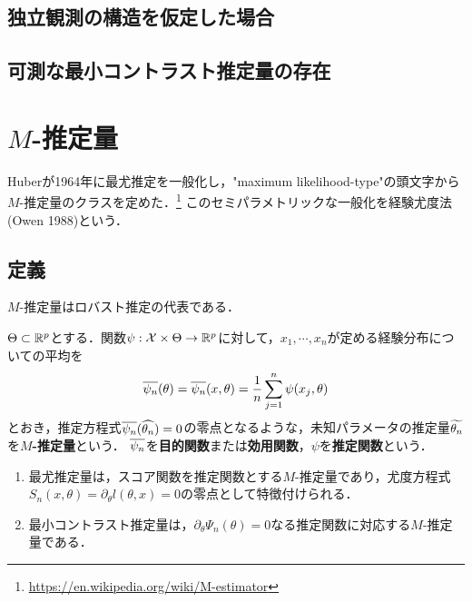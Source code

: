 \documentclass[uplatex,dvipdfmx]{jsreport}
\begin{document}
\subsection{独立観測の構造を仮定した場合}

\subsection{可測な最小コントラスト推定量の存在}

\section{$M$-推定量}

\begin{tcolorbox}[colframe=ForestGreen, colback=ForestGreen!10!white,breakable,colbacktitle=ForestGreen!40!white,coltitle=black,fonttitle=\bfseries\sffamily,
title=]
    Huberが1964年に最尤推定を一般化し，"maximum likelihood-type"の頭文字から$M$-推定量のクラスを定めた．\footnote{\url{https://en.wikipedia.org/wiki/M-estimator}}
    このセミパラメトリックな一般化を経験尤度法(Owen 1988)という．
\end{tcolorbox}

\subsection{定義}

\begin{tcolorbox}[colframe=ForestGreen, colback=ForestGreen!10!white,breakable,colbacktitle=ForestGreen!40!white,coltitle=black,fonttitle=\bfseries\sffamily,
title=]
    $M$-推定量はロバスト推定の代表である．
\end{tcolorbox}

\begin{definition}
    $\Theta\subset\mathbb{R}^p$とする．関数$\psi:\mathcal{X}\times\Theta\to\mathbb{R}^p$に対して，$x_1,\cdots,x_n$が定める経験分布についての平均を
    \[\overline{\psi_n}(\theta)=\overline{\psi_n}(x,\theta)=\frac{1}{n}\sum^n_{j=1}\psi(x_j,\theta)\]
    とおき，推定方程式$\overline{\psi_n}(\widehat{\theta_n})=0$の零点となるような，未知パラメータの推定量$\widetilde{\theta_n}$を\textbf{$M$-推定量}という．
    $\overline{\psi_n}$を\textbf{目的関数}または\textbf{効用関数}，$\psi$を\textbf{推定関数}という．
\end{definition}

\begin{example}\mbox{}
    \begin{enumerate}
        \item 最尤推定量は，スコア関数を推定関数とする$M$-推定量であり，尤度方程式$S_n(x,\theta)=\partial_\theta l(\theta,x)=0$の零点として特徴付けられる．
        \item 最小コントラスト推定量は，$\partial_\theta\Psi_n(\theta)=0$なる推定関数に対応する$M$-推定量である．
    \end{enumerate}
\end{example}
\end{document}
